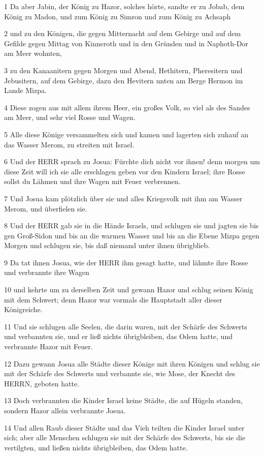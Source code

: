 \par 1 Da aber Jabin, der König zu Hazor, solches hörte, sandte er zu Jobab, dem König zu Madon, und zum König zu Simron und zum König zu Achsaph
\par 2 und zu den Königen, die gegen Mitternacht auf dem Gebirge und auf dem Gefilde gegen Mittag von Kinneroth und in den Gründen und in Naphoth-Dor am Meer wohnten,
\par 3 zu den Kanaanitern gegen Morgen und Abend, Hethitern, Pheresitern und Jebusitern, auf dem Gebirge, dazu den Hevitern unten am Berge Hermon im Lande Mizpa.
\par 4 Diese zogen aus mit allem ihrem Heer, ein großes Volk, so viel als des Sandes am Meer, und sehr viel Rosse und Wagen.
\par 5 Alle diese Könige versammelten sich und kamen und lagerten sich zuhauf an das Wasser Merom, zu streiten mit Israel.
\par 6 Und der HERR sprach zu Josua: Fürchte dich nicht vor ihnen! denn morgen um diese Zeit will ich sie alle erschlagen geben vor den Kindern Israel; ihre Rosse sollst du Lähmen und ihre Wagen mit Feuer verbrennen.
\par 7 Und Josua kam plötzlich über sie und alles Kriegsvolk mit ihm am Wasser Merom, und überfielen sie.
\par 8 Und der HERR gab sie in die Hände Israels, und schlugen sie und jagten sie bis gen Groß-Sidon und bis an die warmen Wasser und bis an die Ebene Mizpa gegen Morgen und schlugen sie, bis daß niemand unter ihnen übrigblieb.
\par 9 Da tat ihnen Josua, wie der HERR ihm gesagt hatte, und lähmte ihre Rosse und verbrannte ihre Wagen
\par 10 und kehrte um zu derselben Zeit und gewann Hazor und schlug seinen König mit dem Schwert; denn Hazor war vormals die Hauptstadt aller dieser Königreiche.
\par 11 Und sie schlugen alle Seelen, die darin waren, mit der Schärfe des Schwerts und verbannten sie, und er ließ nichts übrigbleiben, das Odem hatte, und verbrannte Hazor mit Feuer.
\par 12 Dazu gewann Josua alle Städte dieser Könige mit ihren Königen und schlug sie mit der Schärfe des Schwerts und verbannte sie, wie Mose, der Knecht des HERRN, geboten hatte.
\par 13 Doch verbrannten die Kinder Israel keine Städte, die auf Hügeln standen, sondern Hazor allein verbrannte Josua.
\par 14 Und allen Raub dieser Städte und das Vieh teilten die Kinder Israel unter sich; aber alle Menschen schlugen sie mit der Schärfe des Schwerts, bis sie die vertilgten, und ließen nichts übrigbleiben, das Odem hatte.
